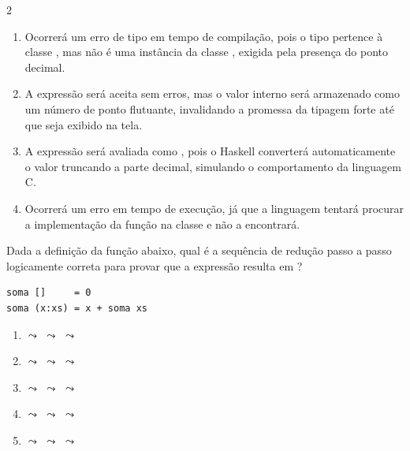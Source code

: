 \documentclass[a4paper,10pt,brazil]{article}
\begin{document}
\begin{multicols}{2}
\begin{enumerate}
  \item Ocorrerá um erro de tipo em tempo de compilação, pois o tipo  pertence à classe , mas não é uma instância da classe , exigida pela presença do ponto decimal.

  \item A expressão será aceita sem erros, mas o valor interno será armazenado como um número de ponto flutuante, invalidando a promessa da tipagem forte até que seja exibido na tela.

  \item A expressão será avaliada como , pois o Haskell converterá automaticamente o valor truncando a parte decimal, simulando o comportamento da linguagem C.

  \item Ocorrerá um erro em tempo de execução, já que a linguagem tentará procurar a implementação da função  na classe  e não a encontrará.


\end{enumerate}

Dada a definição da função  abaixo, qual é a sequência de redução passo a passo logicamente correta para provar que a expressão  resulta em ?

\begin{verbatim}
soma []     = 0
soma (x:xs) = x + soma xs
\end{verbatim}

\begin{enumerate}
  \item {} $\leadsto$  $\leadsto$  $\leadsto$ 

  \item {} $\leadsto$  $\leadsto$  $\leadsto$ 

  \item {} $\leadsto$  $\leadsto$  $\leadsto$ 

  \item {} $\leadsto$  $\leadsto$  $\leadsto$ 

  \item {} $\leadsto$  $\leadsto$  $\leadsto$ 



\end{enumerate}
\end{multicols}
\end{document}
